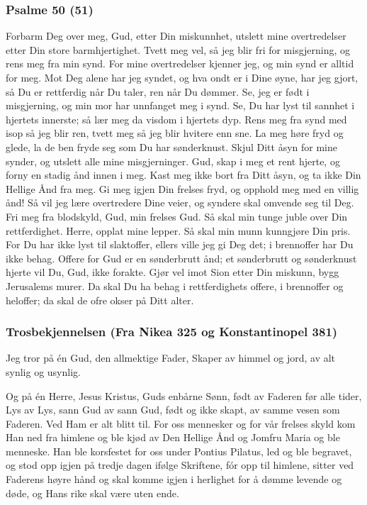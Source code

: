 \subsubsection{Psalme 50 (51)}

Forbarm Deg over meg, Gud, etter Din miskunnhet, utslett mine overtredelser etter Din store barmhjertighet. Tvett meg vel, så jeg blir fri for misgjerning, og rens meg fra min synd. For mine overtredelser kjenner jeg, og min synd er alltid for meg. Mot Deg alene har jeg syndet, og hva ondt er i Dine øyne, har jeg gjort, så Du er rettferdig når Du taler, ren når Du dømmer. Se, jeg er født i misgjerning, og min mor har unnfanget meg i synd. Se, Du har lyst til sannhet i hjertets innerste; så lær meg da visdom i hjertets dyp. Rens meg fra synd med isop så jeg blir ren, tvett meg så jeg blir hvitere enn sne. La meg høre fryd og glede, la de ben fryde seg som Du har sønderknust. Skjul Ditt åsyn for mine synder, og utslett alle mine misgjerninger. Gud, skap i meg et rent hjerte, og forny en stadig ånd innen i meg. Kast meg ikke bort fra Ditt åsyn, og ta ikke Din Hellige Ånd fra meg. Gi meg igjen Din frelses fryd, og opphold meg med en villig ånd! Så vil jeg lære overtredere Dine veier, og syndere skal omvende seg til Deg. Fri meg fra blodskyld, Gud, min frelses Gud. Så skal min tunge juble over Din rettferdighet. Herre, opplat mine lepper. Så skal min munn kunngjøre Din pris. For Du har ikke lyst til slaktoffer, ellers ville jeg gi Deg det; i brennoffer har Du ikke behag. Offere for Gud er en sønderbrutt ånd; et sønderbrutt og sønderknust hjerte vil Du, Gud, ikke forakte. Gjør vel imot Sion etter Din miskunn, bygg Jerusalems murer. Da skal Du ha behag i rettferdighets offere, i brennoffer og heloffer; da skal de ofre okser på Ditt alter. 

\subsubsection{Trosbekjennelsen (Fra Nikea 325 og Konstantinopel 381) }

Jeg tror på én Gud, den allmektige Fader, Skaper av himmel og jord, av alt synlig og usynlig. 

Og på én Herre, Jesus Kristus, Guds enbårne Sønn, født av Faderen før alle tider, Lys av Lys, sann Gud av sann Gud, født og ikke skapt, av samme vesen som Faderen. Ved Ham er alt blitt til. For oss mennesker og for vår frelses skyld kom Han ned fra himlene og ble kjød av Den Hellige Ånd og Jomfru Maria og ble menneske. Han ble korsfestet for oss under Pontius Pilatus, led og ble begravet, og stod opp igjen på tredje dagen ifølge Skriftene, fór opp til himlene, sitter ved Faderens høyre hånd og skal komme igjen i herlighet for å dømme levende og døde, og Hans rike skal være uten ende. 

